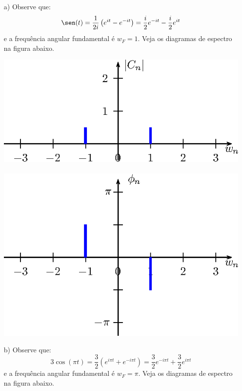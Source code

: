 \begin{resp}
 \begin{itemize}
  \item [a)]
 Observe que: 
 \begin{equation}
  \sen(t)=\frac{1}{2i}\left(e^{it}-e^{-it}\right)= \frac{i}{2}e^{-it} - \frac{i}{2}e^{it}
\end{equation} 
e a frequência angular fundamental é $w_F=1$. Veja os diagramas de espectro na figura abaixo.

\includegraphics{cap_diagramas_espectro/pics/figura_6}~\includegraphics{cap_diagramas_espectro/pics/figura_7}


\item [b)]
 Observe que:
 \begin{equation}3\cos(\pi t)=\frac{3}{2}\left(e^{i\pi t}+e^{-i\pi t}\right)= \frac{3}{2}e^{-i\pi t} + \frac{3}{2}e^{i\pi t}
\end{equation} 
 e a frequência angular fundamental é $w_F=\pi$. Veja os diagramas de espectro na figura abaixo. 


\end{itemize}
\end{resp}
